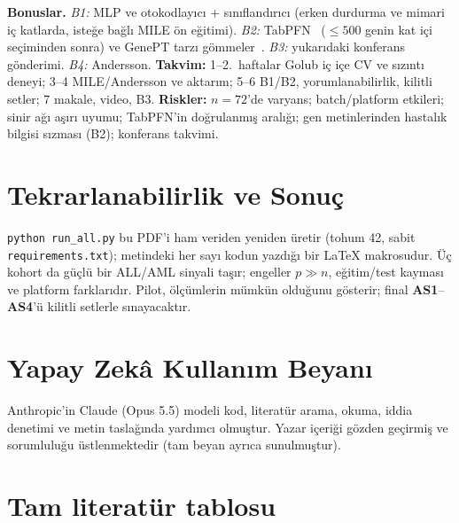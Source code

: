 \documentclass[conference]{IEEEtran}
\newcommand{\AS}[1]{\textbf{AS#1}}
\begin{document}
\textbf{Bonuslar.} \emph{B1:} MLP ve otokodlayıcı + sınıflandırıcı (erken durdurma ve mimari iç
katlarda, isteğe bağlı MILE ön eğitimi). \emph{B2:} TabPFN~\cite{hollmann2025} ($\leq 500$ genin kat
içi seçiminden sonra) ve GenePT tarzı gömmeler~\cite{chen2025genept}. \emph{B3:} yukarıdaki konferans
gönderimi. \emph{B4:} Andersson. \textbf{Takvim:} 1--2.\ haftalar Golub iç içe CV ve sızıntı deneyi;
3--4 MILE/Andersson ve aktarım; 5--6 B1/B2, yorumlanabilirlik, kilitli setler; 7 makale, video, B3.
\textbf{Riskler:} $n=72$'de varyans; batch/platform etkileri; sinir ağı aşırı uyumu; TabPFN'in
doğrulanmış aralığı; gen metinlerinden hastalık bilgisi sızması (B2); konferans takvimi.

\section{Tekrarlanabilirlik ve Sonuç}\label{sec:repro}
\texttt{python run\_all.py} bu PDF'i ham veriden yeniden üretir (tohum 42, sabit
\texttt{requirements.txt}); metindeki her sayı kodun yazdığı bir \LaTeX{} makrosudur. Üç kohort da
güçlü bir ALL/AML sinyali taşır; engeller $p\gg n$, eğitim/test kayması ve platform farklarıdır. Pilot, ölçümlerin mümkün olduğunu gösterir;
 final \AS{1}--\AS{4}'ü kilitli setlerle
sınayacaktır.

\section*{Yapay Zekâ Kullanım Beyanı}
Anthropic'in Claude (Opus 5.5) modeli kod, literatür arama, okuma, iddia denetimi ve metin taslağında
yardımcı olmuştur. Yazar içeriği gözden geçirmiş ve sorumluluğu üstlenmektedir (tam beyan ayrıca sunulmuştur).




\clearpage
\onecolumn
\appendices
\section{Tam literatür tablosu}
{\scriptsize\setlength{\tabcolsep}{3pt}
}
\end{document}
